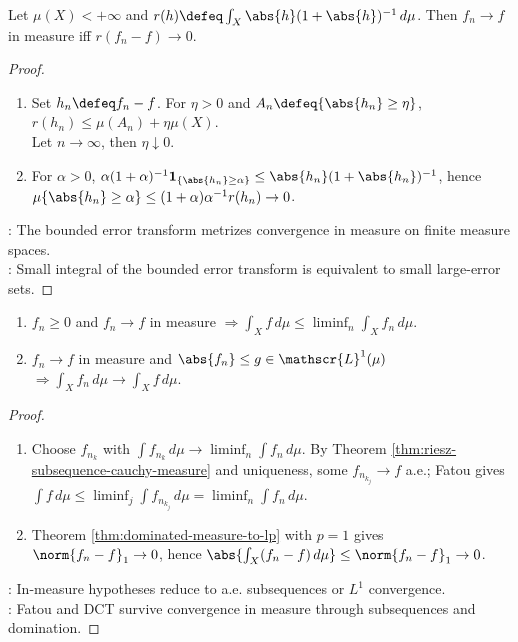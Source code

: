 \begin{proposition} \label{prop:finite-measure-integral-metric-for-measure-convergence} 
Let $\mu(X)<+\infty$ and $r(h)\defeq\int_X\abs{h}(1+\abs{h})^{-1}\,d\mu$. Then $f_n\to f$ in measure iff $r(f_n-f)\to0$.
\begin{proof}
\begin{enumerate}[label=\roman*.]
\setlength{\itemsep}{0pt}
\item[$(\Rightarrow)$] Set $h_n\defeq f_n-f$. For $\eta>0$ and $A_n\defeq\{\abs{h_n}\geq\eta\}$, $r(h_n)\leq\mu(A_n)+\eta\mu(X)$.\\
Let $n\to\infty$, then $\eta\downarrow0$.
\item[$(\Leftarrow)$] For $\alpha>0$, $\alpha(1+\alpha)^{-1}\mathbf{1}_{\{\abs{h_n}\geq\alpha\}}\leq\abs{h_n}(1+\abs{h_n})^{-1}$, hence $\mu\{\abs{h_n}\geq\alpha\}\leq(1+\alpha)\alpha^{-1}r(h_n)\to0$.
\end{enumerate}
: The bounded error transform metrizes convergence in measure on finite measure spaces.\\
: Small integral of the bounded error transform is equivalent to small large-error sets.
\end{proof}
\end{proposition}

\begin{corollary} \label{cor:fatou-and-dct-with-convergence-in-measure} 
\begin{enumerate}[label=(\roman*)]
\setlength{\itemsep}{0pt}
\item $f_n\geq0$ and $f_n\to f$ in measure $\Rightarrow \int_X f\,d\mu\leq\liminf_n\int_Xf_n\,d\mu$.
\item $f_n\to f$ in measure and $\abs{f_n}\leq g\in\mathscr{L}^1(\mu)$ $\Rightarrow \int_Xf_n\,d\mu\to\int_Xf\,d\mu$.
\end{enumerate}
\begin{proof}
\begin{enumerate}[label=(\roman*)]
\setlength{\itemsep}{0pt}
\item Choose $f_{n_k}$ with $\int f_{n_k}\,d\mu\to\liminf_n\int f_n\,d\mu$. By Theorem \ref{thm:riesz-subsequence-cauchy-measure} and uniqueness, some $f_{n_{k_j}}\to f$ a.e.; Fatou gives $\int f\,d\mu\leq\liminf_j\int f_{n_{k_j}}\,d\mu=\liminf_n\int f_n\,d\mu$.
\item Theorem \ref{thm:dominated-measure-to-lp} with $p=1$ gives $\norm{f_n-f}_1\to0$, hence $\abs{\int_X(f_n-f)\,d\mu}\leq\norm{f_n-f}_1\to0$.
\end{enumerate}
: In-measure hypotheses reduce to a.e. subsequences or $L^1$ convergence.\\
: Fatou and DCT survive convergence in measure through subsequences and domination.
\end{proof}
\end{corollary}

